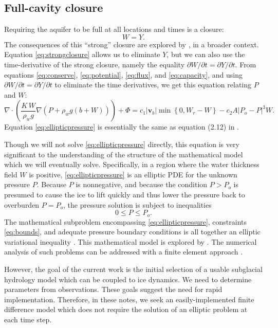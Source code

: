\documentclass[12pt,final]{amsart}%
\newcommand\bv{\mathbf{v}}
\newcommand{\Div}{\nabla\cdot}
\newcommand{\grad}{\nabla}
\begin{document}
\subsection*{Full-cavity closure}  Requiring the aquifer to be full at all locations and times is a closure:
\begin{equation}
W = Y.\label{eq:strongclosure}
\end{equation}
The consequences of this ``strong'' closure are explored by \cite{Schoofetal2012}, in a broader context.  Equation \eqref{eq:strongclosure} allows us to eliminate $Y$, but we can also use the time-derivative of the strong closure, namely the equality $\partial W/\partial t = \partial Y/\partial t$.  From equations \eqref{eq:conserve}, \eqref{eq:potential}, \eqref{eq:flux}, and \eqref{eq:capacity}, and using $\partial W/\partial t = \partial Y/\partial t$ to eliminate the time derivatives, we get this equation relating $P$ and $W$:
\begin{equation}
\Div \left(\frac{K\,W}{\rho_w g} \grad \left(P + \rho_w g (b+W)\right) \right) + \Phi = c_1 |\bv_b| \min\left\{0,W_r - W\right\} - c_2 A |P_o - P|^3 W.\label{eq:ellipticpressure}
\end{equation}
Equation \eqref{eq:ellipticpressure} is essentially the same as equation (2.12) in \citep{Schoofetal2012}.

Though we will not solve \eqref{eq:ellipticpressure} directly, this equation is very significant to the understanding of the structure of the mathematical model which we will eventually solve.  Specifically, in a region where the water thickness field $W$ is positive, \eqref{eq:ellipticpressure} is an elliptic PDE for the unknown pressure $P$.  Because $P$ is nonnegative, and because the condition $P>P_o$ is presumed to cause the ice to lift quickly and thus lower the pressure back to overburden $P=P_o$, the pressure solution is subject to inequalities
\begin{equation}
0 \le P \le P_o. \label{eq:bounds}
\end{equation}
The mathematical subproblem encompassing \eqref{eq:ellipticpressure}, constraints \eqref{eq:bounds}, and adequate pressure boundary conditions is all together an elliptic variational inequality \citep{KinderlehrerStampacchia}.  This mathematical model is explored by \cite{Schoofetal2012}.  The numerical analysis of such problems can be addressed with a finite element approach \citep{SchoofStream,JouvetBueler2012}.

However, the goal of the current work is the initial selection of a usable subglacial hydrology model which can be coupled to ice dynamics.  We need to determine parameters from observations.  These goals suggest the need for rapid implementation.  Therefore, in these notes, we seek an easily-implemented finite difference model which does not require the solution of an elliptic problem at each time step.
\end{document}
